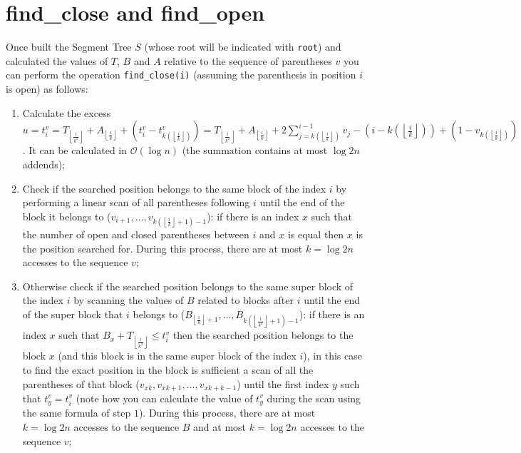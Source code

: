\documentclass{article}
\begin{document}
\section{find\_close and find\_open}
Once built the Segment Tree $S$ (whose root will be indicated with \texttt{root}) and calculated the values of $T$, $B$ and $A$ relative to the sequence of parentheses $v$ you can perform the operation \texttt{find\_close(i)} (assuming the parenthesis in position $i$ is open) as follows:
    \begin{enumerate}
        \item Calculate the excess $u = t^v_i = T_{\left\lfloor{\frac{i}{k^2}}\right\rfloor}+A_{\left\lfloor{\frac{i}{k}}\right\rfloor} + (t^v_i-t^v_{k\left(\left\lfloor{\frac{i}{k}}\right\rfloor\right)})= T_{\left\lfloor{\frac{i}{k^2}}\right\rfloor}+A_{\left\lfloor{\frac{i}{k}}\right\rfloor}+2\sum_{j=k(\left\lfloor{\frac{i}{k}}\right\rfloor)}^{i-1} v_j-(i-k(\left\lfloor{\frac{i}{k}}\right\rfloor))+(1-v_{k(\left\lfloor{\frac{i}{k}}\right\rfloor)})$. It can be calculated in $\mathcal{O}(\log{n})$ (the summation contains at most $\log{2n}$ addends);
        \item Check if the searched position belongs to the same block of the index $i$ by performing a linear scan of all parentheses following $i$ until the end of the block it belongs to ($v_{i+1},\dots,v_{k(\left\lfloor{\frac{i}{k}}\right\rfloor+1)-1}$): if there is an index $x$ such that the number of open and closed parentheses between $i$ and $x$ is equal then $x$ is the position searched for. During this process, there are at most $k=\log{2n}$ accesses to the sequence $v$;
        \item Otherwise check if the searched position belongs to the same super block of the index $i$ by scanning the values of $B$ related to blocks after $i$ until the end of the super block that $i$ belongs to ($B_{\left\lfloor{\frac{i}{k}}\right\rfloor+1},\dots,B_{k(\left\lfloor{\frac{i}{k^2}}\right\rfloor+1)-1}$): if there is an index $x$ such that $B_x+T_{\left \lfloor{\frac{i}{k^2}}\right\rfloor} \leq t^v_i$ then the searched position belongs to the block $x$ (and this block is in the same super block of the index $i$), in this case to find the exact position in the block is sufficient a scan of all the parentheses of that block ($v_{xk},v_{xk+1},\dots,v_{xk+k-1}$) until the first index $y$ such that $t^v_y=t^v_i$ (note how you can calculate the value of $t^v_y$ during the scan using the same formula of step $1$). During this process, there are at most $k=\log{2n}$ accesses to the sequence $B$ and at most $k=\log{2n}$ accesses to the sequence $v$;

\end{enumerate}
\end{document}
